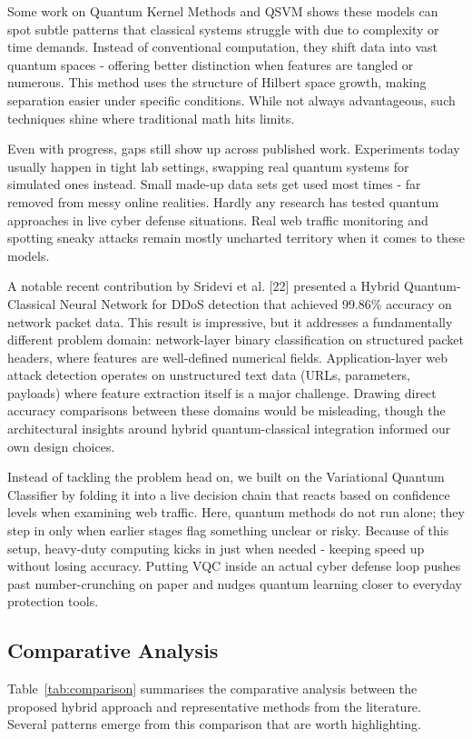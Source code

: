 \documentclass[journal,onecolumn]{IEEEtran}
\begin{document}
Some work on Quantum Kernel Methods and QSVM shows these models can spot subtle patterns that classical systems struggle with due to complexity or time demands. Instead of conventional computation, they shift data into vast quantum spaces - offering better distinction when features are tangled or numerous. This method uses the structure of Hilbert space growth, making separation easier under specific conditions. While not always advantageous, such techniques shine where traditional math hits limits.

Even with progress, gaps still show up across published work. Experiments today usually happen in tight lab settings, swapping real quantum systems for simulated ones instead. Small made-up data sets get used most times - far removed from messy online realities. Hardly any research has tested quantum approaches in live cyber defense situations. Real web traffic monitoring and spotting sneaky attacks remain mostly uncharted territory when it comes to these models.

A notable recent contribution by Sridevi et al. [22] presented a Hybrid Quantum-Classical Neural Network for DDoS detection that achieved 99.86\% accuracy on network packet data. This result is impressive, but it addresses a fundamentally different problem domain: network-layer binary classification on structured packet headers, where features are well-defined numerical fields. Application-layer web attack detection operates on unstructured text data (URLs, parameters, payloads) where feature extraction itself is a major challenge. Drawing direct accuracy comparisons between these domains would be misleading, though the architectural insights around hybrid quantum-classical integration informed our own design choices.

Instead of tackling the problem head on, we built on the Variational Quantum Classifier by folding it into a live decision chain that reacts based on confidence levels when examining web traffic. Here, quantum methods do not run alone; they step in only when earlier stages flag something unclear or risky. Because of this setup, heavy-duty computing kicks in just when needed - keeping speed up without losing accuracy. Putting VQC inside an actual cyber defense loop pushes past number-crunching on paper and nudges quantum learning closer to everyday protection tools.

\subsection{Comparative Analysis}
Table~\ref{tab:comparison} summarises the comparative analysis between the proposed hybrid approach and representative methods from the literature. Several patterns emerge from this comparison that are worth highlighting.
\end{document}
